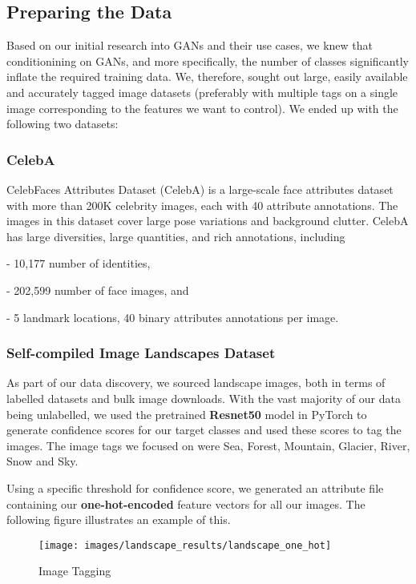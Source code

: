 \documentclass[twocolumn,10pt,cleanfoot]{asme2ej}
\begin{document}
\subsection{Preparing the Data}
Based on our initial research into GANs and their use cases, we knew that conditionining on GANs, and more specifically, the number of classes significantly inflate the required training data. We, therefore, sought out large, easily available and accurately tagged image datasets (preferably with multiple tags on a single image corresponding to the features we want to control). We ended up with the following two datasets:

\subsubsection{CelebA}
CelebFaces Attributes Dataset (CelebA) is a large-scale face attributes dataset with more than 200K celebrity images, each with 40 attribute annotations. The images in this dataset cover large pose variations and background clutter. CelebA has large diversities, large quantities, and rich annotations, including

- 10,177 number of identities,

- 202,599 number of face images, and

- 5 landmark locations, 40 binary attributes annotations per image.

\subsubsection{Self-compiled Image Landscapes Dataset}
As part of our data discovery, we sourced landscape images, both in terms of labelled datasets and bulk image downloads. With the vast majority of our data being unlabelled, we used the pretrained \textbf{Resnet50} model in PyTorch to generate confidence scores for our target classes and used these scores to tag the images. The image tags we focused on were Sea, Forest, Mountain, Glacier, River, Snow and Sky.

Using a specific threshold for confidence score, we generated an attribute file containing our \textbf{one-hot-encoded} feature vectors for all our images. The following figure illustrates an example of this.

\begin{figure}
\centerline{\texttt{[image: images/landscape\_results/landscape\_one\_hot]}}
\caption{Image Tagging}
\label{one_hot_fig}
\end{figure}
\end{document}
